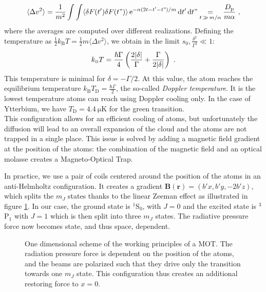\documentclass[11pt]{article}
\newcommand{\e}[1]{\text{e}^{#1}}
\newcommand{\mathsc}[1]{\mathrm{\scriptscriptstyle {#1}}}
\numberwithin{equation}{section}
\numberwithin{figure}{section}
\begin{document}
%
%
\begin{equation}
	\langle \Delta v^2 \rangle = \frac{1}{m^2} \int \int \langle\delta F(t')\delta F(t")\rangle \, \e{- \alpha (2t - t' - t") / m} \dd{t'} \dd{t"} \underset{t \,\gg\, m/\alpha}{=} \frac{D_\text{p}}{m \alpha}~,
\end{equation}
%
where the averages are computed over different realizations. Defining the temperature as $\frac{1}{2} k_\mathsc{B} T = \frac{1}{2} m \langle \Delta v^2 \rangle$, we obtain in the limit $s_0, \frac{\delta^2}{\Gamma^2} \ll 1$:
%
\begin{equation}
	k_\mathsc{B} T = \frac{\hbar \Gamma}{4} \left( \frac{2 \abs{\delta}}{\Gamma} + \frac{\Gamma}{2 \abs{\delta}} \right)~.
\end{equation}
%
This temperature is minimal for $\delta = - \Gamma / 2$. At this value, the atom reaches the equilibrium temperature $k_\mathsc{B} T_\mathsc{D} = \frac{\hbar \Gamma}{2} $, the so-called \emph{Doppler temperature}. It is the lowest temperature atoms can reach using Doppler cooling only. In the case of Ytterbium, we have $T_\mathsc{D} = \SI{4.4}{\micro\kelvin}$ for the green transition. \\

This configuration allows for an efficient cooling of atoms, but unfortunately the diffusion will lead to an overall expansion of the cloud and the atoms are not trapped in a single place. This issue is solved by adding a magnetic field gradient at the position of the atoms: the combination of the magnetic field and an optical molasse creates a Magneto-Optical Trap. 

In practice, we use a pair of coils centered around the position of the atoms in an anti-Helmholtz configuration. It creates a gradient $\mathbf{B}(\mathbf{r}) = (b' x, b'y, -2b'z)$, which splits the $m_J$ states thanks to the linear Zeeman effect as illustrated in figure \ref{fig:MOT_theory}. In our case, the ground state is $^1$S$_0$, with $J=0$ and the excited state is $^3$P$_1$ with $J=1$ which is then split into three $m_J$ states. The radiative pressure force now becomes state, and thus space, dependent.
%
\begin{figure}[htbp]
	\centering
    
	\caption{\small One dimensional scheme of the working principles of a MOT. The radiation pressure force is dependent on the position of the atoms, and the beams are polarized such that they drive only the transition towards one $m_J$ state. This configuration thus creates an additional restoring force to $x=0$.}
    \label{fig:MOT_theory}
\end{figure}
%
\end{document}
